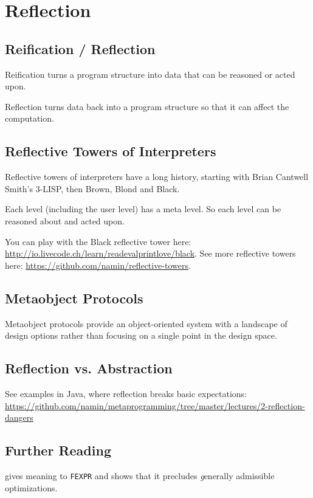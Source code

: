 \chapter{Reflection}

\section{Reification / Reflection}

Reification turns a program structure into data that can be reasoned
or acted upon.

Reflection turns data back into a program structure so that it can
affect the computation.

\section{Reflective Towers of Interpreters}

Reflective towers of interpreters have a long history, starting with
Brian Cantwell Smith's 3-LISP, then Brown, Blond and Black.

Each level (including the user level) has a meta level. So each level
can be reasoned about and acted upon.

You can play with the Black reflective tower here:
\url{http://io.livecode.ch/learn/readevalprintlove/black}.
See more reflective towers here: \url{https://github.com/namin/reflective-towers}.

\section{Metaobject Protocols}

Metaobject protocols provide an object-oriented system with a
landscape of design options rather than focusing on a single point in
the design space.

\section{Reflection vs. Abstraction}

See examples in Java, where reflection breaks basic expectations: \url{https://github.com/namin/metaprogramming/tree/master/lectures/2-reflection-dangers}

\section{Further Reading}

\cite{Wand1998} gives meaning to {\tt FEXPR} and shows that it precludes
{\emph generally} admissible optimizations.

